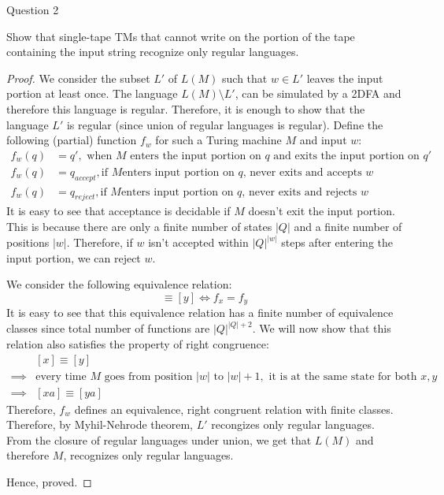 \begin{solution}{Question 2}\label{ques:2}
    \begin{question}
        Show that single-tape TMs that cannot write on the portion of the tape containing the input string recognize only regular languages.
    \end{question}
    \tcblower{}
    \begin{proof}
      We consider the subset $L'$ of $L(M)$ such that $w \in L'$ leaves the input portion at least once. The language $L(M) \setminus L'$, can be simulated by a 2DFA and therefore this language is regular. Therefore, it is enough to show that the language $L'$ is regular (since union of regular languages is regular). Define the following (partial) function $f_w$ for such a Turing machine $M$ and input $w$:
        \begin{equation}
          \begin{split}
            f_w(q) &= q',\text{ when }M\text{ enters the input portion on }q\text{ and exits the input portion on }q'\\
            f_w(q) &= q_{accept},\text{if }M\text{enters input portion on }q\text{, never exits and accepts }w\\
            f_w(q) &= q_{reject},\text{if }M\text{enters input portion on }q\text{, never exits and rejects }w
          \end{split}
        \end{equation}
        It is easy to see that acceptance is decidable if $M$ doesn't exit the input portion. This is because there are only a finite number of states $|Q|$ and a finite number of positions $|w|$. Therefore, if $w$ isn't accepted within $|Q|^{|w|}$ steps after entering the input portion, we can reject $w$.\par
        We consider the following equivalence relation:
        \begin{equation}
          [x] \equiv [y] \iff f_x = f_y
        \end{equation}
        It is easy to see that this equivalence relation has a finite number of equivalence classes since total number of functions are $|Q|^{|Q|+2}$. We will now show that this relation also satisfies the property of right congruence:
        \begin{equation}
          \begin{split}
            &[x] \equiv [y] \\
            \implies &\text{every time }M\text{ goes from position }|w|\text{ to }|w|+1,\text{ it is at the same state for both }x, y\\
            \implies &[xa] \equiv [ya]
          \end{split}
        \end{equation}
        Therefore, $f_w$ defines an equivalence, right congruent relation with finite classes. Therefore, by Myhil-Nehrode theorem, $L'$ recongizes only regular languages. From the closure of regular languages under union, we get that $L(M)$ and therefore $M$, recognizes only regular languages.\par
        Hence, proved.
    \end{proof}
\end{solution}
